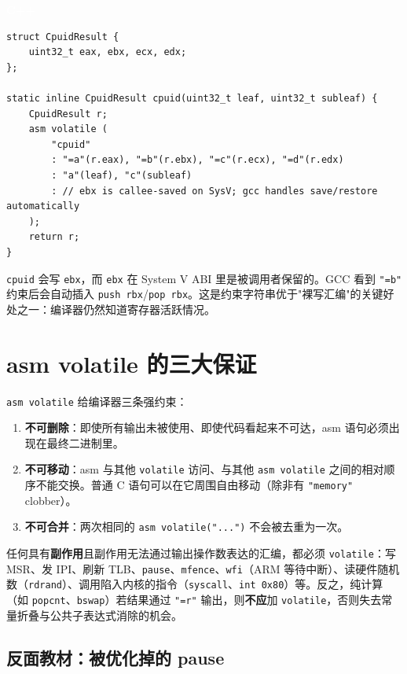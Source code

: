 \documentclass[12pt,a4paper,fontset=fandol]{ctexbook}
\newcommand{\cpplabel}{%
  \begin{tcolorbox}[enhanced,colback=cppheadbg,colframe=cppheadbg,
    arc=1mm,boxrule=0mm,left=6pt,right=6pt,top=2pt,bottom=2pt,
    halign=left,oversize]
    \textcolor{white}{\small\bfseries C++}
  \end{tcolorbox}\vspace{-4pt}}
\newcommand{\kw}[1]{\texttt{#1}}
\begin{document}
\cpplabel
\begin{lstlisting}[style=cppstyle]
struct CpuidResult {
    uint32_t eax, ebx, ecx, edx;
};

static inline CpuidResult cpuid(uint32_t leaf, uint32_t subleaf) {
    CpuidResult r;
    asm volatile (
        "cpuid"
        : "=a"(r.eax), "=b"(r.ebx), "=c"(r.ecx), "=d"(r.edx)
        : "a"(leaf), "c"(subleaf)
        : // ebx is callee-saved on SysV; gcc handles save/restore automatically
    );
    return r;
}
\end{lstlisting}

\texttt{cpuid} 会写 \texttt{ebx}，而 \texttt{ebx} 在 System V ABI 里是被调用者保留的。GCC 看到 \texttt{"=b"} 约束后会自动插入 \texttt{push rbx}/\allowbreak{}\texttt{pop rbx}。这是约束字符串优于"裸写汇编"的关键好处之一：编译器仍然知道寄存器活跃情况。

\section{asm volatile 的三大保证}\label{sec:asm-volatile}

\texttt{asm volatile} 给编译器三条强约束：

\begin{enumerate}[nosep]
  \item \textbf{不可删除}：即使所有输出未被使用、即使代码看起来不可达，asm 语句必须出现在最终二进制里。
  \item \textbf{不可移动}：asm 与其他 \kw{volatile} 访问、与其他 \texttt{asm volatile} 之间的相对顺序不能交换。普通 C 语句可以在它周围自由移动（除非有 \texttt{"memory"} clobber）。
  \item \textbf{不可合并}：两次相同的 \texttt{asm volatile("...")} 不会被去重为一次。
\end{enumerate}

\begin{tcolorbox}[guideline={何时必须 asm volatile}]
任何具有\textbf{副作用}且副作用无法通过输出操作数表达的汇编，都必须 \kw{volatile}：写 MSR、发 IPI、刷新 TLB、\texttt{pause}、\texttt{mfence}、\texttt{wfi}（ARM 等待中断）、读硬件随机数（\texttt{rdrand}）、调用陷入内核的指令（\texttt{syscall}、\texttt{int 0x80}）等。反之，纯计算（如 \texttt{popcnt}、\texttt{bswap}）若结果通过 \texttt{"=r"} 输出，则\textbf{不应}加 \kw{volatile}，否则失去常量折叠与公共子表达式消除的机会。
\end{tcolorbox}

\subsection{反面教材：被优化掉的 pause}\label{sec:asm-pause-bug}
\end{document}
